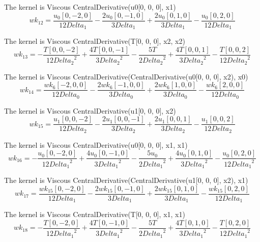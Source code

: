 \documentclass{article}
\begin{document}
The kernel is Viscous CentralDerivative(u0[0, 0, 0], x1) \begin{dmath}{wk_{12}} = \frac{{u_{0}}[{0,-2,0}]}{12 Delta_1} - 
\frac{2 {u_{0}}[{0,-1,0}]}{3 Delta_1} + \frac{2 {u_{0}}[{0,1,0}]}{3 
Delta_1} - \frac{{u_{0}}[{0,2,0}]}{12 Delta_1}\end{dmath}

The kernel is Viscous CentralDerivative(T[0, 0, 0], x2, x2) \begin{dmath}{wk_{13}} = - \frac{{T}[{0,0,-2}]}{12 {Delta_2}^{2}} + 
\frac{4 {T}[{0,0,-1}]}{3 {Delta_2}^{2}} - \frac{5 {T}}{2 
{Delta_2}^{2}} + \frac{4 {T}[{0,0,1}]}{3 {Delta_2}^{2}} - 
\frac{{T}[{0,0,2}]}{12 {Delta_2}^{2}}\end{dmath}

The kernel is Viscous CentralDerivative(CentralDerivative(u0[0, 0, 0], x2), x0) \begin{dmath}{wk_{14}} = \frac{{wk_{6}}[{-2,0,0}]}{12 Delta_0} - 
\frac{2 {wk_{6}}[{-1,0,0}]}{3 Delta_0} + \frac{2 {wk_{6}}[{1,0,0}]}{3 
Delta_0} - \frac{{wk_{6}}[{2,0,0}]}{12 Delta_0}\end{dmath}

The kernel is Viscous CentralDerivative(u1[0, 0, 0], x2) \begin{dmath}{wk_{15}} = \frac{{u_{1}}[{0,0,-2}]}{12 Delta_2} - 
\frac{2 {u_{1}}[{0,0,-1}]}{3 Delta_2} + \frac{2 {u_{1}}[{0,0,1}]}{3 
Delta_2} - \frac{{u_{1}}[{0,0,2}]}{12 Delta_2}\end{dmath}

The kernel is Viscous CentralDerivative(u0[0, 0, 0], x1, x1) \begin{dmath}{wk_{16}} = - \frac{{u_{0}}[{0,-2,0}]}{12 {Delta_1}^{2}} 
+ \frac{4 {u_{0}}[{0,-1,0}]}{3 {Delta_1}^{2}} - \frac{5 {u_{0}}}{2 
{Delta_1}^{2}} + \frac{4 {u_{0}}[{0,1,0}]}{3 {Delta_1}^{2}} - 
\frac{{u_{0}}[{0,2,0}]}{12 {Delta_1}^{2}}\end{dmath}

The kernel is Viscous CentralDerivative(CentralDerivative(u1[0, 0, 0], x2), x1) \begin{dmath}{wk_{17}} = \frac{{wk_{15}}[{0,-2,0}]}{12 Delta_1} - 
\frac{2 {wk_{15}}[{0,-1,0}]}{3 Delta_1} + \frac{2 
{wk_{15}}[{0,1,0}]}{3 Delta_1} - \frac{{wk_{15}}[{0,2,0}]}{12 
Delta_1}\end{dmath}

The kernel is Viscous CentralDerivative(T[0, 0, 0], x1, x1) \begin{dmath}{wk_{18}} = - \frac{{T}[{0,-2,0}]}{12 {Delta_1}^{2}} + 
\frac{4 {T}[{0,-1,0}]}{3 {Delta_1}^{2}} - \frac{5 {T}}{2 
{Delta_1}^{2}} + \frac{4 {T}[{0,1,0}]}{3 {Delta_1}^{2}} - 
\frac{{T}[{0,2,0}]}{12 {Delta_1}^{2}}\end{dmath}
\end{document}
